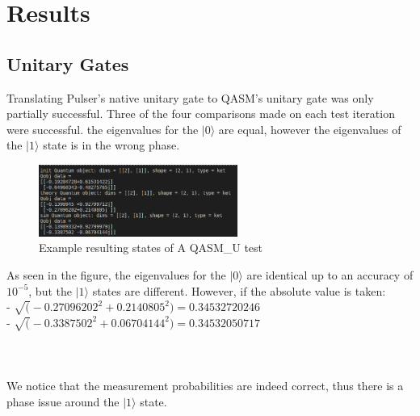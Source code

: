 \section{Results}
\subsection{Unitary Gates}
Translating Pulser's native unitary gate to QASM's unitary gate was only partially successful. Three of the four comparisons made on each test iteration were successful.
the eigenvalues for the $|0 \rangle$ are equal, however the eigenvalues of the $|1 \rangle$ state is in the wrong phase.
\begin{figure}
    \centering
    \includegraphics[width=65mm]{./Images/QASM_U_result.png}
    \caption{Example resulting states of A QASM\_U test} 
    \label{fig:[QASM_U]}
  
  \end{figure}
As seen in the figure, the eigenvalues for the $|0 \rangle$ are identical up to an accuracy of $10^{-5}$, but the $|1 \rangle$ states are different.
However, if the absolute value is taken:\\
- $\sqrt(-0.27096202^{2}+0.2140805^{2}) = 0.34532720246$ \\
- $\sqrt(-0.3387502^{2}+0.06704144^{2}) = 0.34532050717$\\
\\\\\\
We notice that the measurement probabilities are indeed correct, thus there is a phase issue around the $|1 \rangle$ state.


